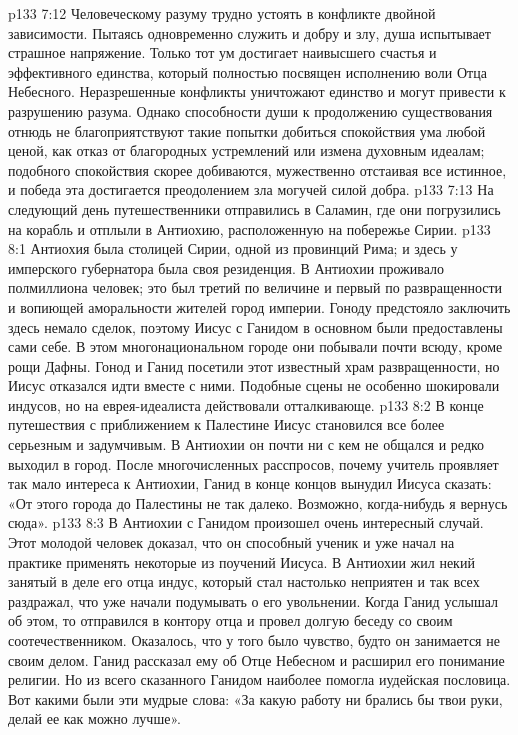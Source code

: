 \vs p133 7:12 Человеческому разуму трудно устоять в конфликте двойной зависимости. Пытаясь одновременно служить и добру и злу, душа испытывает страшное напряжение. Только тот ум достигает наивысшего счастья и эффективного единства, который полностью посвящен исполнению воли Отца Небесного. Неразрешенные конфликты уничтожают единство и могут привести к разрушению разума. Однако способности души к продолжению существования отнюдь не благоприятствуют такие попытки добиться спокойствия ума любой ценой, как отказ от благородных устремлений или измена духовным идеалам; подобного спокойствия скорее добиваются, мужественно отстаивая все истинное, и победа эта достигается преодолением зла могучей силой добра.
\vs p133 7:13 \pc На следующий день путешественники отправились в Саламин, где они погрузились на корабль и отплыли в Антиохию, расположенную на побережье Сирии.
\vs p133 8:1 Антиохия была столицей Сирии, одной из провинций Рима; и здесь у имперского губернатора была своя резиденция. В Антиохии проживало полмиллиона человек; это был третий по величине и первый по развращенности и вопиющей аморальности жителей город империи. Гоноду предстояло заключить здесь немало сделок, поэтому Иисус с Ганидом в основном были предоставлены сами себе. В этом многонациональном городе они побывали почти всюду, кроме рощи Дафны. Гонод и Ганид посетили этот известный храм развращенности, но Иисус отказался идти вместе с ними. Подобные сцены не особенно шокировали индусов, но на еврея\hyp{}идеалиста действовали отталкивающе.
\vs p133 8:2 В конце путешествия с приближением к Палестине Иисус становился все более серьезным и задумчивым. В Антиохии он почти ни с кем не общался и редко выходил в город. После многочисленных расспросов, почему учитель проявляет так мало интереса к Антиохии, Ганид в конце концов вынудил Иисуса сказать: «От этого города до Палестины не так далеко. Возможно, когда\hyp{}нибудь я вернусь сюда».
\vs p133 8:3 \pc В Антиохии с Ганидом произошел очень интересный случай. Этот молодой человек доказал, что он способный ученик и уже начал на практике применять некоторые из поучений Иисуса. В Антиохии жил некий занятый в деле его отца индус, который стал настолько неприятен и так всех раздражал, что уже начали подумывать о его увольнении. Когда Ганид услышал об этом, то отправился в контору отца и провел долгую беседу со своим соотечественником. Оказалось, что у того было чувство, будто он занимается не своим делом. Ганид рассказал ему об Отце Небесном и расширил его понимание религии. Но из всего сказанного Ганидом наиболее помогла иудейская пословица. Вот какими были эти мудрые слова: «За какую работу ни брались бы твои руки, делай ее как можно лучше».
